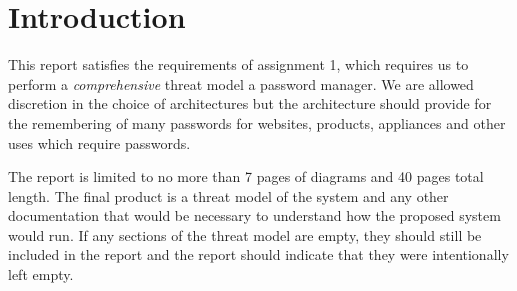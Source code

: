 \chapter*{Introduction}

This report satisfies the requirements of assignment 1\cite{2017myersa1handout}, which requires us to perform a \textit{comprehensive} threat model a password manager.  We are allowed discretion in the choice of architectures but the architecture should provide for the remembering of many passwords for websites, products, appliances and other uses which require passwords.
\par The report is limited to no more than 7 pages of diagrams and 40 pages total length.  The final product is a threat model of the system and any other documentation that would be necessary to understand how the proposed system would run.  If any sections of the threat model are empty, they should still be included in the report and the report should indicate
that they were intentionally left empty.

\mainmatter
